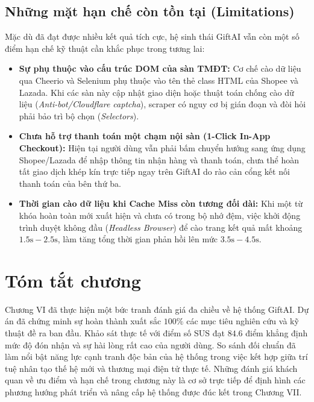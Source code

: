 \subsection{Những mặt hạn chế còn tồn tại (Limitations)}
Mặc dù đã đạt được nhiều kết quả tích cực, hệ sinh thái GiftAI vẫn còn một số điểm hạn chế kỹ thuật cần khắc phục trong tương lai:
\begin{itemize}
    \item \textbf{Sự phụ thuộc vào cấu trúc DOM của sàn TMĐT:} Cơ chế cào dữ liệu qua Cheerio và Selenium phụ thuộc vào tên thẻ class HTML của Shopee và Lazada. Khi các sàn này cập nhật giao diện hoặc thuật toán chống cào dữ liệu (\textit{Anti-bot/Cloudflare captcha}), scraper có nguy cơ bị gián đoạn và đòi hỏi phải bảo trì bộ chọn (\textit{Selectors}).
    \item \textbf{Chưa hỗ trợ thanh toán một chạm nội sàn (1-Click In-App Checkout):} Hiện tại người dùng vẫn phải bấm chuyển hướng sang ứng dụng Shopee/Lazada để nhập thông tin nhận hàng và thanh toán, chưa thể hoàn tất giao dịch khép kín trực tiếp ngay trên GiftAI do rào cản cổng kết nối thanh toán của bên thứ ba.
    \item \textbf{Thời gian cào dữ liệu khi Cache Miss còn tương đối dài:} Khi một từ khóa hoàn toàn mới xuất hiện và chưa có trong bộ nhớ đệm, việc khởi động trình duyệt không đầu (\textit{Headless Browser}) để cào trang kết quả mất khoảng $1.5\text{s} - 2.5\text{s}$, làm tăng tổng thời gian phản hồi lên mức $3.5\text{s} - 4.5\text{s}$.
\end{itemize}

\section{Tóm tắt chương}
Chương VI đã thực hiện một bức tranh đánh giá đa chiều về hệ thống GiftAI. Dự án đã chứng minh sự hoàn thành xuất sắc $100\%$ các mục tiêu nghiên cứu và kỹ thuật đề ra ban đầu. Khảo sát thực tế với điểm số SUS đạt $\mathbf{84.6}$ điểm khẳng định mức độ đón nhận và sự hài lòng rất cao của người dùng. So sánh đối chuẩn đã làm nổi bật năng lực cạnh tranh độc bản của hệ thống trong việc kết hợp giữa trí tuệ nhân tạo thế hệ mới và thương mại điện tử thực tế. Những đánh giá khách quan về ưu điểm và hạn chế trong chương này là cơ sở trực tiếp để định hình các phương hướng phát triển và nâng cấp hệ thống được đúc kết trong Chương VII.